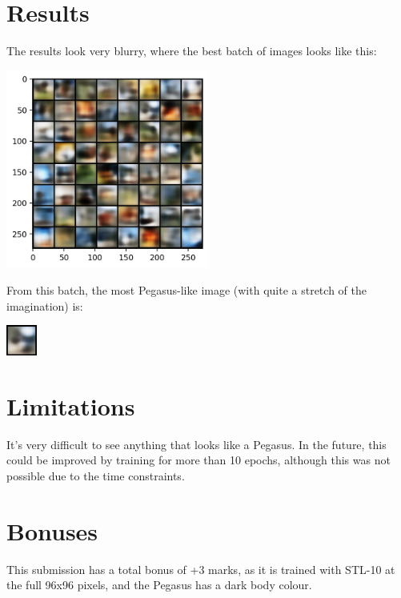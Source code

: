 \documentclass{article}
\begin{document}
\section{Results}
The results look very blurry, where the best batch of images looks like this:
\begin{center}
    \includegraphics[width=0.5\textwidth]{figures/best-batch.png}
\end{center}
From this batch, the most Pegasus-like image (with quite a stretch of the imagination) is:
\begin{center}
    \includegraphics[width=0.075\textwidth]{figures/best-pegasus.png}
\end{center}

\section{Limitations}
It's very difficult to see anything that looks like a Pegasus. 
In the future, this could be improved by training for more than 10 epochs, 
although this was not possible due to the time constraints.

\section*{Bonuses}
This submission has a total bonus of +3 marks, as it is trained with STL-10 at the full 96x96 pixels, and the Pegasus has a dark body colour.

\printbibliography
\end{document}
